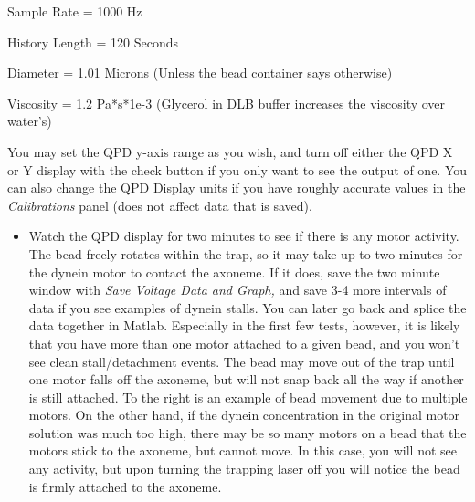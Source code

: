\documentclass{../lab}
\begin{document}
Sample Rate = 1000 Hz

History Length = 120 Seconds

Diameter = 1.01 Microns (Unless the bead container says otherwise)

Viscosity = 1.2 Pa*s*1e-3 (Glycerol in DLB buffer increases the viscosity over water's)

You may set the QPD y-axis range as you wish, and turn off either the QPD X or Y display with the check button if you only want to see the output of one. You can also change the QPD Display units if you have roughly accurate values in the \emph{Calibrations} panel (does not affect data that is saved).

\begin{itemize}
    \item Watch the QPD display for two minutes to see if there is any motor activity. The bead freely rotates within the trap, so it may take up to two minutes for the dynein motor to contact the axoneme. If it does, save the two minute window with \emph{Save Voltage Data and Graph,} and save 3-4 more intervals of data if you see examples of dynein stalls. You can later go back and splice the data together in Matlab. Especially in the first few tests, however, it is likely that you have more than one motor attached to a given bead, and you won't see clean stall/detachment events. The bead may move out of the trap until one motor falls off the axoneme, but will not snap back all the way if another is still attached. To the right is an example of bead movement due to multiple motors. On the other hand, if the dynein concentration in the original motor solution was much too high, there may be so many motors on a bead that the motors stick to the axoneme, but cannot move. In this case, you will not see any activity, but upon turning the trapping laser off you will notice the bead is firmly attached to the axoneme.


\end{itemize}
\end{document}
